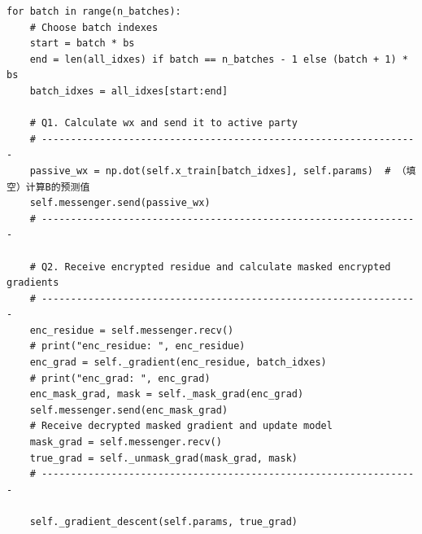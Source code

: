 \documentclass[twoside,11pt]{article}
\begin{document}
\begin{lstlisting}
for batch in range(n_batches):
    # Choose batch indexes
    start = batch * bs
    end = len(all_idxes) if batch == n_batches - 1 else (batch + 1) * bs
    batch_idxes = all_idxes[start:end]

    # Q1. Calculate wx and send it to active party
    # -----------------------------------------------------------------
    passive_wx = np.dot(self.x_train[batch_idxes], self.params)  # （填空）计算B的预测值
    self.messenger.send(passive_wx)
    # -----------------------------------------------------------------

    # Q2. Receive encrypted residue and calculate masked encrypted gradients
    # -----------------------------------------------------------------
    enc_residue = self.messenger.recv()
    # print("enc_residue: ", enc_residue)
    enc_grad = self._gradient(enc_residue, batch_idxes)
    # print("enc_grad: ", enc_grad)
    enc_mask_grad, mask = self._mask_grad(enc_grad)
    self.messenger.send(enc_mask_grad)
    # Receive decrypted masked gradient and update model
    mask_grad = self.messenger.recv()
    true_grad = self._unmask_grad(mask_grad, mask)
    # -----------------------------------------------------------------

    self._gradient_descent(self.params, true_grad)
\end{lstlisting}
\end{document}
